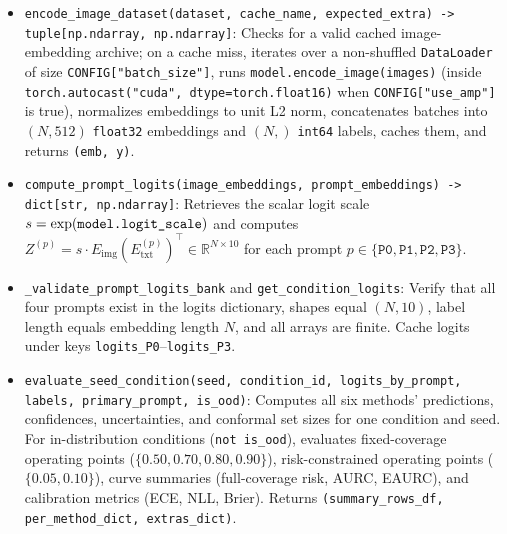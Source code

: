 \documentclass[11pt,a4paper]{article}
\begin{document}
\begin{itemize}
  \item \texttt{encode\_\allowbreak{}image\_\allowbreak{}dataset(\allowbreak{}dataset,\allowbreak{} cache\_\allowbreak{}name,\allowbreak{} expected\_\allowbreak{}extra) -> tuple[np.\allowbreak{}ndarray,\allowbreak{} np.\allowbreak{}ndarray]}: Checks for a valid cached image-embedding archive; on a cache miss, iterates over a non-shuffled \texttt{DataLoader} of size \texttt{CONFIG["batch\_\allowbreak{}size"]}, runs \texttt{model.\allowbreak{}encode\_\allowbreak{}image(\allowbreak{}images)} (inside \texttt{torch.\allowbreak{}autocast(\allowbreak{}"cuda",\allowbreak{} dtype=torch.\allowbreak{}float16)} when \texttt{CONFIG["use\_\allowbreak{}amp"]} is true), normalizes embeddings to unit L2 norm, concatenates batches into $(N, 512)$ \texttt{float32} embeddings and $(N,)$ \texttt{int64} labels, caches them, and returns \texttt{(\allowbreak{}emb,\allowbreak{} y)}.
  \item \texttt{compute\_\allowbreak{}prompt\_\allowbreak{}logits(\allowbreak{}image\_\allowbreak{}embeddings,\allowbreak{} prompt\_\allowbreak{}embeddings) -> dict[str,\allowbreak{} np.\allowbreak{}ndarray]}: Retrieves the scalar logit scale $s = \exp(\texttt{model.\allowbreak{}logit\_\allowbreak{}scale})$ and computes $Z^{(p)} = s \cdot E_{\text{img}} (E_{\text{txt}}^{(p)})^\top \in \mathbb{R}^{N \times 10}$ for each prompt $p \in \{\texttt{P0}, \texttt{P1}, \texttt{P2}, \texttt{P3}\}$.
  \item \texttt{\_\allowbreak{}validate\_\allowbreak{}prompt\_\allowbreak{}logits\_\allowbreak{}bank} and \texttt{get\_\allowbreak{}condition\_\allowbreak{}logits}: Verify that all four prompts exist in the logits dictionary, shapes equal $(N, 10)$, label length equals embedding length $N$, and all arrays are finite. Cache logits under keys \texttt{logits\_\allowbreak{}P0}--\texttt{logits\_\allowbreak{}P3}.
  \item \texttt{evaluate\_\allowbreak{}seed\_\allowbreak{}condition(\allowbreak{}seed,\allowbreak{} condition\_\allowbreak{}id,\allowbreak{} logits\_\allowbreak{}by\_\allowbreak{}prompt,\allowbreak{} labels,\allowbreak{} primary\_\allowbreak{}prompt,\allowbreak{} is\_\allowbreak{}ood)}: Computes all six methods' predictions, confidences, uncertainties, and conformal set sizes for one condition and seed. For in-distribution conditions (\texttt{not is\_\allowbreak{}ood}), evaluates fixed-coverage operating points ($\{0.50, 0.70, 0.80, 0.90\}$), risk-constrained operating points ($\{0.05, 0.10\}$), curve summaries (full-coverage risk, AURC, EAURC), and calibration metrics (ECE, NLL, Brier). Returns \texttt{(\allowbreak{}summary\_\allowbreak{}rows\_\allowbreak{}df,\allowbreak{} per\_\allowbreak{}method\_\allowbreak{}dict,\allowbreak{} extras\_\allowbreak{}dict)}.
\end{itemize}
\end{document}
